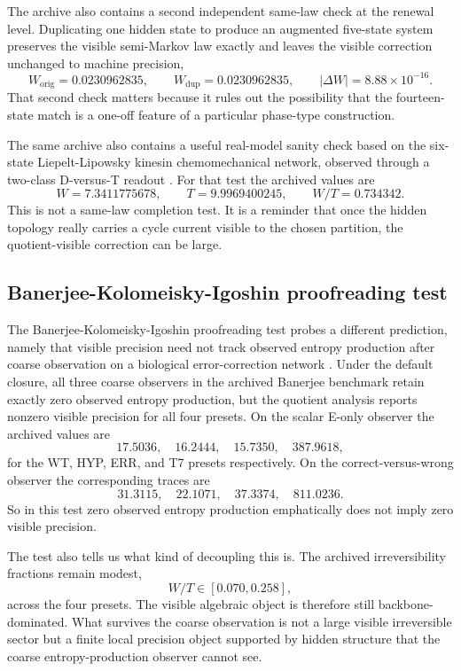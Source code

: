 \documentclass[11pt]{article}
\numberwithin{equation}{section}
\theoremstyle{thmcompact}
\theoremstyle{remark}
\begin{document}
The archive also contains a second independent same-law check at the renewal level. Duplicating one hidden state to produce an augmented five-state system preserves the visible semi-Markov law exactly and leaves the visible correction unchanged to machine precision,
\[
W_{\mathrm{orig}}=0.0230962835,
\qquad
W_{\mathrm{dup}}=0.0230962835,
\qquad
|\Delta W|=8.88\times 10^{-16}.
\]
That second check matters because it rules out the possibility that the fourteen-state match is a one-off feature of a particular phase-type construction.


The same archive also contains a useful real-model sanity check based on the six-state Liepelt-Lipowsky kinesin chemomechanical network, observed through a two-class D-versus-T readout \citep{LiepeltLipowsky2007}. For that test the archived values are
\[
W=7.3411775678,
\qquad
T=9.9969400245,
\qquad
W/T=0.734342.
\]
This is not a same-law completion test. It is a reminder that once the hidden topology really carries a cycle current visible to the chosen partition, the quotient-visible correction can be large.

\subsection{Banerjee-Kolomeisky-Igoshin proofreading test}

The Banerjee-Kolomeisky-Igoshin proofreading test probes a different prediction, namely that visible precision need not track observed entropy production after coarse observation on a biological error-correction network \citep{BanerjeeKolomeiskyIgoshin2017}. Under the default closure, all three coarse observers in the archived Banerjee benchmark retain exactly zero observed entropy production, but the quotient analysis reports nonzero visible precision for all four presets. On the scalar E-only observer the archived values are
\[
17.5036,\quad 16.2444,\quad 15.7350,\quad 387.9618,
\]
for the WT, HYP, ERR, and T7 presets respectively. On the correct-versus-wrong observer the corresponding traces are
\[
31.3115,\quad 22.1071,\quad 37.3374,\quad 811.0236.
\]
So in this test zero observed entropy production emphatically does not imply zero visible precision.

The test also tells us what kind of decoupling this is. The archived irreversibility fractions remain modest,
\[
W/T\in[0.070,0.258],
\]
across the four presets. The visible algebraic object is therefore still backbone-dominated. What survives the coarse observation is not a large visible irreversible sector but a finite local precision object supported by hidden structure that the coarse entropy-production observer cannot see.
\end{document}
